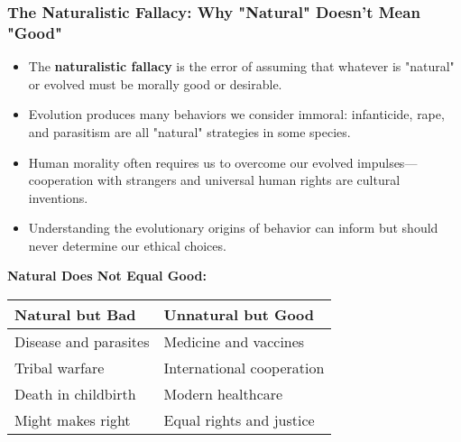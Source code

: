 \documentclass{beamer}
\begin{document}
	\begin{frame}
		\frametitle{The Naturalistic Fallacy: Why "Natural" Doesn't Mean "Good"}
		\begin{itemize}
			\item The \textbf{naturalistic fallacy} is the error of assuming that whatever is "natural" or evolved must be morally good or desirable.
			\item Evolution produces many behaviors we consider immoral: infanticide, rape, and parasitism are all "natural" strategies in some species.
			\item Human morality often requires us to overcome our evolved impulses—cooperation with strangers and universal human rights are cultural inventions.
			\item Understanding the evolutionary origins of behavior can inform but should never determine our ethical choices.
		\end{itemize}
		\begin{example}
			\scriptsize
			\textbf{Natural Does Not Equal Good:}
			\begin{tabular}{|l|l|}
				\hline
				\textbf{Natural but Bad} & \textbf{Unnatural but Good} \\
				\hline
				Disease and parasites & Medicine and vaccines \\
				Tribal warfare & International cooperation \\
				Death in childbirth & Modern healthcare \\
				Might makes right & Equal rights and justice \\
				\hline
			\end{tabular}
		\end{example}
	\end{frame}
	
\end{document}
